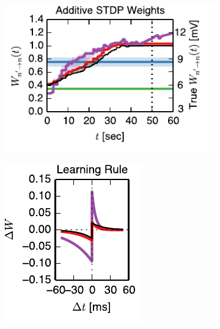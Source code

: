 \begin{figure}[t]

  \begin{subfigure}[T]{2.4in}
    \flushleft
    \includegraphics[width=\textwidth]{figures/ch4/fig4_add_thr_trajectory_mv}    
    \label{fig:fig4_add_nothr_trajectory}
  \end{subfigure}
  \begin{subfigure}[T]{1.45in}
    \includegraphics[width=\textwidth]{figures/ch4/fig4_add_thr_stdp_rule}    

\end{subfigure}
\end{figure}
